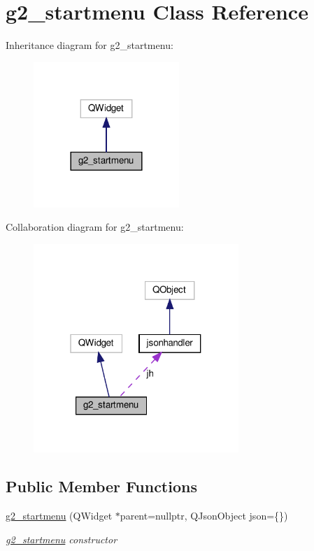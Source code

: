 \hypertarget{classg2__startmenu}{}\section{g2\+\_\+startmenu Class Reference}
\label{classg2__startmenu}


Inheritance diagram for g2\+\_\+startmenu\+:
\nopagebreak
\begin{figure}[H]
\begin{center}
\leavevmode
\includegraphics[width=156pt]{classg2__startmenu__inherit__graph}
\end{center}
\end{figure}


Collaboration diagram for g2\+\_\+startmenu\+:
\nopagebreak
\begin{figure}[H]
\begin{center}
\leavevmode
\includegraphics[width=220pt]{classg2__startmenu__coll__graph}
\end{center}
\end{figure}
\subsection*{Public Member Functions}
\begin{DoxyCompactItemize}
\item 
\hyperlink{classg2__startmenu_a64af506bcf731b441c756fdf389fdffe}{g2\+\_\+startmenu} (Q\+Widget $\ast$parent=nullptr, Q\+Json\+Object json=\{\})
\begin{DoxyCompactList}\small\item\em \hyperlink{classg2__startmenu}{g2\+\_\+startmenu} constructor \end{DoxyCompactList}\end{DoxyCompactItemize}
